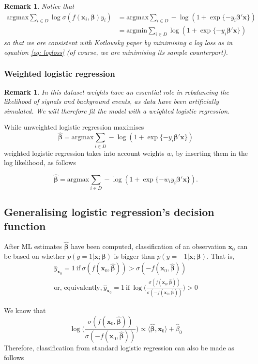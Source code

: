 \documentclass[]{article}
\newcommand{\x}{\mathbf{x}}
\newcommand{\bbeta}{\boldsymbol \beta}
\newtheorem{remark}[theorem]{Remark}
\begin{document}
\begin{remark}
Notice that 
\begin{align*}
\text{argmax}\sum_{i\in D}\log\sigma(f(\x_i,\bbeta)y_i)&=\text{argmax}\sum_{i\in D}-\log(1+\exp\{-y_i\bbeta'\x \}) \\
&=\text{argmin}\sum_{i\in D}\log(1+\exp\{- y_i\bbeta'\x\})
\end{align*} so that we are consistent with Kotlowsky paper by minimising a log loss as in equation \ref{eq: logloss} (of course, we are minimising its sample counterpart).
\end{remark}
\subsubsection{Weighted logistic regression}
\begin{remark}
In this dataset weights have an essential role in rebalancing the likelihood of signals and background events, as data have been artificially simulated. We will therefore fit the model with a weighted logistic regression.
\end{remark}

While unweighted logistic regression maximises 
$$\hat{\bbeta}=\text{argmax}\sum_{i\in D}-\log(1+\exp\{-y_i\bbeta'\x \})$$
weighted logistic regression takes into account weights $w_i$ by inserting them in the log likelihood, as follows

$$\hat{\bbeta}=\text{argmax}\sum_{i\in D}-\log(1+\exp\{-w_i y_i\bbeta'\x \}).$$

\subsection{Generalising logistic regression's decision function}
\label{app:decision function}

After ML estimates $\hat{\bbeta}$ have been computed, classification of an observation $\x_0$ can be based on whether $p(y=1|\x;\bbeta)$ is bigger than $p(y=-1|\x;\bbeta)$. That is,
\begin{align*}
\hat{y}_{\x_0}=1 \ \text{if} \ \sigma(f(\x_0,\hat{\bbeta}))>\sigma(-f(\x_0,\hat{\bbeta})) \\
\text{or, equivalently,} \
\hat{y}_{\x_0}=1  \ \text{if} \ \log \Big( \frac{\sigma(f(\x_0,\hat{\bbeta}))}{\sigma(-f(\x_0,\hat{\bbeta}))}\Big)>0
\end{align*} 

We know that $$\log \Big( \frac{\sigma(f(\x_0,\hat{\bbeta}))}{\sigma(-f(\x_0,\hat{\bbeta}))}\Big)\propto \langle\hat{\bbeta},\x_0\rangle+\hat{\beta}_0$$
Therefore, classification from standard logistic regression can also be made as follows
\end{document}
